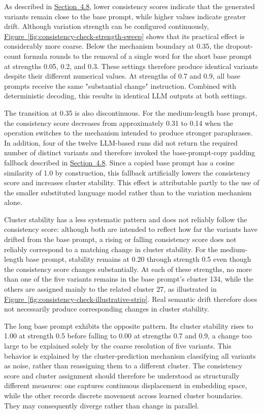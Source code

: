 As described in \hyperref[sec:4.8]{Section~4.8}, lower consistency scores indicate that the generated variants remain close to the base prompt, while higher values indicate greater drift. Although variation strength can be configured continuously, \hyperref[fig:consistency-check-strength-sweep]{Figure~\ref*{fig:consistency-check-strength-sweep}} shows that its practical effect is considerably more coarse. Below the mechanism boundary at 0.35, the dropout-count formula rounds to the removal of a single word for the short base prompt at strengths 0.05, 0.2, and 0.3. These settings therefore produce identical variants despite their different numerical values. At strengths of 0.7 and 0.9, all base prompts receive the same "substantial change" instruction. Combined with deterministic decoding, this results in identical LLM outputs at both settings.

The transition at 0.35 is also discontinuous. For the medium-length base prompt, the consistency score decreases from approximately 0.31 to 0.14 when the operation switches to the mechanism intended to produce stronger paraphrases. In addition, four of the twelve LLM-based runs did not return the required number of distinct variants and therefore invoked the base-prompt-copy padding fallback described in \hyperref[sec:4.8]{Section~4.8}. Since a copied base prompt has a cosine similarity of 1.0 by construction, this fallback artificially lowers the consistency score and increases cluster stability. This effect is attributable partly to the use of the smaller substituted language model rather than to the variation mechanism alone.

Cluster stability has a less systematic pattern and does not reliably follow the consistency score: although both are intended to reflect how far the variants have drifted from the base prompt, a rising or falling consistency score does not reliably correspond to a matching change in cluster stability. For the medium-length base prompt, stability remains at 0.20 through strength 0.5 even though the consistency score changes substantially. At each of these strengths, no more than one of the five variants remains in the base prompt's cluster 134, while the others are assigned mainly to the related cluster 27, as illustrated in \hyperref[fig:consistency-check-illustrative-strip]{Figure~\ref*{fig:consistency-check-illustrative-strip}}. Real semantic drift therefore does not necessarily produce corresponding changes in cluster stability.

The long base prompt exhibits the opposite pattern. Its cluster stability rises to 1.00 at strength 0.5 before falling to 0.00 at strengths 0.7 and 0.9, a change too large to be explained solely by the coarse resolution of five variants. This behavior is explained by the cluster-prediction mechanism classifying all variants as noise, rather than reassigning them to a different cluster. The consistency score and cluster assignment should therefore be understood as structurally different measures: one captures continuous displacement in embedding space, while the other records discrete movement across learned cluster boundaries. They may consequently diverge rather than change in parallel.

